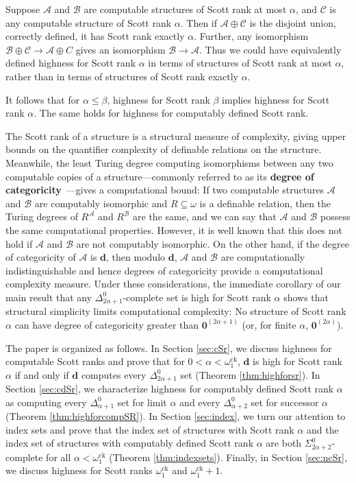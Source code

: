 \documentclass[10pt,a4paper]{amsart}
\newcommand\+[1]{\mathcal{#1}}
\renewcommand\*[1]{\mathbf{#1}}
\renewcommand\=[1]{\text{#1}}
\renewcommand\*[1]{\mathbf{#1}}
\newcommand{\A}{\mathcal{A}}
\newcommand{\C}{\mathcal{C}}
\newcommand{\B}{\mathcal{B}}
\newcommand{\ock}{\omega_{1}^{\mathrm{ck}}}
\newcommand{\nat}{\omega}
\newcommand{\define}[1]{\textbf{#1}}
\begin{document}
Suppose $\A$ and $\B$ are computable structures of Scott rank at most $\alpha$, and $\C$ is any computable structure of Scott rank $\alpha$.  Then if $\A\oplus\C$ is the disjoint union, correctly defined, it has Scott rank exactly $\alpha$.  Further, any isomorphism $\B\oplus\C \to \A\oplus C$ gives an isomorphism $\B\to \A$.  Thus we could have equivalently defined highness for Scott rank $\alpha$ in terms of structures of Scott rank at most $\alpha$, rather than in terms of structures of Scott rank exactly $\alpha$.

It follows that for $\alpha \le \beta$, highness for Scott rank $\beta$ implies highness for Scott rank $\alpha$. The same holds for highness for computably defined Scott rank.

The Scott rank of a structure is a structural measure of complexity, giving upper bounds on the quantifier complexity of definable relations on the structure. Meanwhile, the least Turing degree computing isomorphisms between any two computable copies of a structure---commonly referred to as its \define{degree of categoricity}~\cite{fokina2010}---gives a computational bound: If two computable structures $\+A$ and $\+B$ are computably isomorphic and $R\subseteq\nat$ is a definable relation, then the Turing degrees of $R^\+A$ and $R^\+B$ are the same, and we can say that $\+A$ and $\+B$ possess the same computational properties. However, it is well known that this does not hold if $\+A$ and $\+B$ are not computably isomorphic. On the other hand, if the degree of categoricity of $\+A$ is $\*d$, then modulo $\*d$, $\+A$ and $\+B$ are computationally indistinguishable and hence degrees of categoricity provide a computational complexity measure.
Under these considerations, the immediate corollary of our main result that any $\Delta^0_{2\alpha+1}$-complete set is high for Scott rank $\alpha$ shows that structural simplicity limits computational complexity: No structure of Scott rank $\alpha$ can have degree of categoricity greater than $\mathbf 0^{(2\alpha+1)}$ (or, for finite $\alpha$, $\mathbf 0^{(2\alpha)}$).

The paper is organized as follows. In Section \ref{sec:cSr}, we discuss highness for computable Scott ranks and prove that for $0 < \alpha < \ock$, $\*d$ is high for Scott rank $\alpha$ if and only if $\*d$ computes every $\Delta^0_{2\alpha+1}$ set (Theorem \ref{thm:highforsr}).  In Section \ref{sec:cdSr}, we characterize highness for computably defined Scott rank $\alpha$ as computing every $\Delta^0_{\alpha+1}$ set for limit $\alpha$ and every $\Delta^0_{\alpha+2}$ set for successor $\alpha$ (Theorem \ref{thm:highforcompSR}). In Section \ref{sec:index}, we turn our attention to index sets and prove that the index set of structures with Scott rank $\alpha$ and the index set of structures with computably defined Scott rank $\alpha$ are both $\Sigma^0_{2\alpha+2}$-complete for all $\alpha< \ock$ (Theorem \ref{thm:indexsets}). Finally, in Section \ref{sec:ncSr}, we discuss highness for Scott ranks $\ock$ and $\ock+1$.
\end{document}
